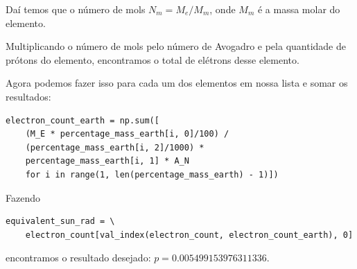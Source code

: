 \documentclass[]{IMTexam}
\begin{document}
\begin{questions}
\begin{parts}
\begin{solution}
			Daí temos que o número de mols $ N_m=M_e/M_m $, onde $ M_m $ é a massa molar do elemento.

			Multiplicando o número de mols pelo número de Avogadro e pela quantidade de prótons do elemento, encontramos o total de elétrons desse elemento.

			Agora podemos fazer isso para cada um dos elementos em nossa lista e somar os resultados:

			\begin{lstlisting}
electron_count_earth = np.sum([
	(M_E * percentage_mass_earth[i, 0]/100) /
	(percentage_mass_earth[i, 2]/1000) *
	percentage_mass_earth[i, 1] * A_N
	for i in range(1, len(percentage_mass_earth) - 1)])
\end{lstlisting}

			Fazendo

			\begin{lstlisting}
equivalent_sun_rad = \
	electron_count[val_index(electron_count, electron_count_earth), 0]
\end{lstlisting}

			encontramos o resultado desejado: $ p=\num{0.005499153976311336} $.
		\end{solution}
	\end{parts}
\end{questions}
\end{document}
